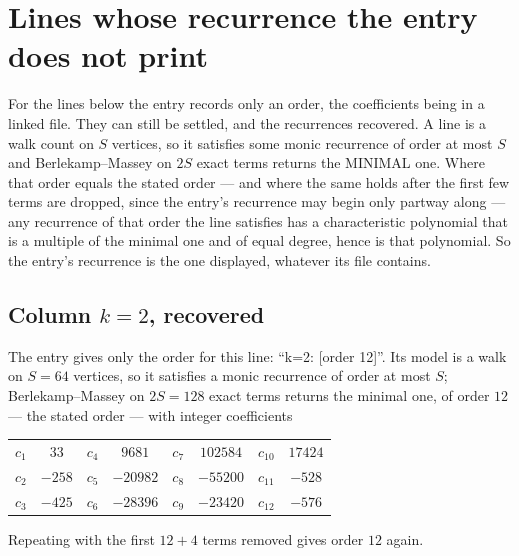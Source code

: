 \documentclass[11pt,a4paper]{article}
\theoremstyle{plain}
\theoremstyle{definition}
\begin{document}
\section{Lines whose recurrence the entry does not print}

For the lines below the entry records only an order, the coefficients being in a linked file.
They can still be settled, and the recurrences recovered. A line is a walk count on $S$
vertices, so it satisfies some monic recurrence of order at most $S$ and Berlekamp--Massey on
$2S$ exact terms returns the MINIMAL one. Where that order equals the stated order --- and
where the same holds after the first few terms are dropped, since the entry's recurrence may
begin only partway along --- any recurrence of that order the line satisfies has a
characteristic polynomial that is a multiple of the minimal one and of equal degree, hence is
that polynomial. So the entry's recurrence is the one displayed, whatever its file contains.

\subsection*{Column $k=2$, recovered}
The entry gives only the order for this line: ``k=2: [order 12]''. Its model is a walk on
$S=64$ vertices, so it satisfies a monic recurrence of order at most $S$;
Berlekamp--Massey on $2S=128$ exact terms returns the minimal one, of order
$12$ --- the stated order --- with integer coefficients
\begin{center}\small\begin{tabular}{cccccccc}
$c_{1}$ & $33$ & $c_{4}$ & $9681$ & $c_{7}$ & $102584$ & $c_{10}$ & $17424$ \\
$c_{2}$ & $-258$ & $c_{5}$ & $-20982$ & $c_{8}$ & $-55200$ & $c_{11}$ & $-528$ \\
$c_{3}$ & $-425$ & $c_{6}$ & $-28396$ & $c_{9}$ & $-23420$ & $c_{12}$ & $-576$ \\
\end{tabular}\end{center}
Repeating with the first $12+4$ terms removed gives order $12$ again.
\end{document}
